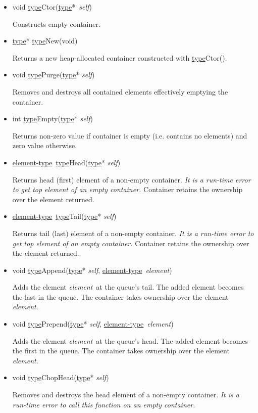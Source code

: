 \documentclass[a4paper]{article}
\newcommand{\st}{\underline{type}}
\newcommand{\et}{\underline{element-type}}
\newcommand{\sv}{\emph{self}}
\newcommand{\ev}{\emph{element}}
\newcommand{\meth}[1]{#1}
\begin{document}
\begin{itemize}


\item \meth{void \st Ctor(\st*\ \sv)}


Constructs empty container.


\item \meth{\st* \st New(void)}


Returns a new heap-allocated container constructed with \meth{\st Ctor()}.


\commonmethods


\item \meth{void \st Purge}(\st* \sv)


Removes and destroys all contained elements effectively emptying the container.


\item \meth{int \st Empty}(\st* \sv)


Returns non-zero value if container is empty (i.e. contains no elements) and zero value otherwise.


\item \meth{\et\ \st Head(\st* \sv)}


Returns head (first) element of a non-empty container.
\emph{It is a run-time error to get top element of an empty container.}
Container retains the ownership over the element returned.


\item \meth{\et\ \st Tail(\st* \sv)}


Returns tail (last) element of a non-empty container.
\emph{It is a run-time error to get top element of an empty container.}
Container retains the ownership over the element returned.


\item \meth{void \st Append(\st* \sv, \et\ \ev)}


Adds the element \ev\ at the queue's tail.
The added element becomes the last in the queue.
The container takes ownership over the element \ev.


\item \meth{void \st Prepend(\st* \sv, \et\ \ev)}


Adds the element \ev\ at the queue's head.
The added element becomes the first in the queue.
The container takes ownership over the element \ev.


\item \meth{void \st ChopHead(\st* \sv)}


Removes and destroys the head element of a non-empty container.
\emph{It is a run-time error to call this function on an empty container.}



\end{itemize}
\end{document}
